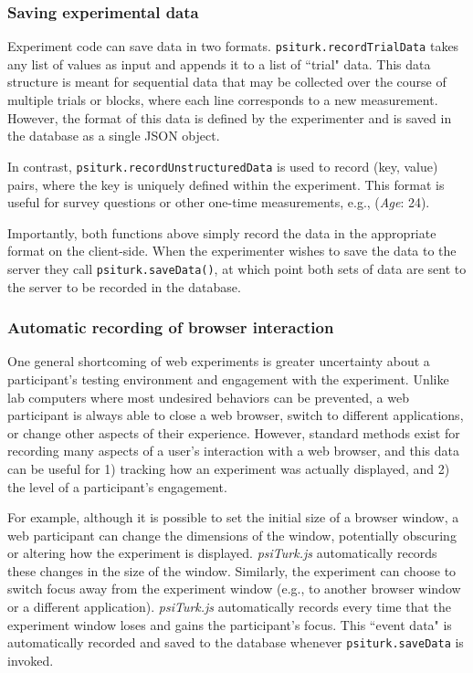 \documentclass[twocolumn]{svjour3}          %
\begin{document}
\subsubsection{Saving experimental data} 

Experiment code can save data in two formats.
\texttt{psiturk.recordTrialData} takes any list of values as input and appends it to a list of ``trial" data.
This data structure is meant for sequential data that may be collected over the course of multiple trials or blocks, where each line corresponds to a new measurement.
However, the format of this data is defined by the experimenter and is saved in the database as a single JSON object.

In contrast, \texttt{psiturk.recordUnstructuredData} is used to record (key, value) pairs, where the key is uniquely defined within the experiment.
This format is useful for survey questions or other one-time measurements, e.g., (\emph{Age}: 24).

Importantly, both functions above simply record the data in the appropriate format on the client-side.
When the experimenter wishes to save the data to the server they call \texttt{psiturk.saveData()}, at which point both sets of data are sent to the server to be recorded in the database.

\subsubsection{Automatic recording of browser interaction}
 
One general shortcoming of web experiments is greater uncertainty about a participant's testing environment and engagement with the experiment.
Unlike lab computers where most undesired behaviors can be prevented, a web participant is always able to close a web browser, switch to different applications, or change other aspects of their experience.
However, standard methods exist for recording many aspects of a user's interaction with a web browser, and this data can be useful for 1) tracking how an experiment was actually displayed, and 2) the level of a participant's engagement.

For example, although it is possible to set the initial size of a browser window, a web participant can change the dimensions of the window, potentially obscuring or altering how the experiment is displayed.
\emph{psiTurk.js} automatically records these changes in the size of the window.
Similarly, the experiment can choose to switch focus away from the experiment window (e.g., to another browser window or a different application).
\emph{psiTurk.js} automatically records every time that the experiment window loses and gains the participant's focus.
This ``event data" is automatically recorded and saved to the database whenever \texttt{psiturk.saveData} is invoked. \\
\end{document}
